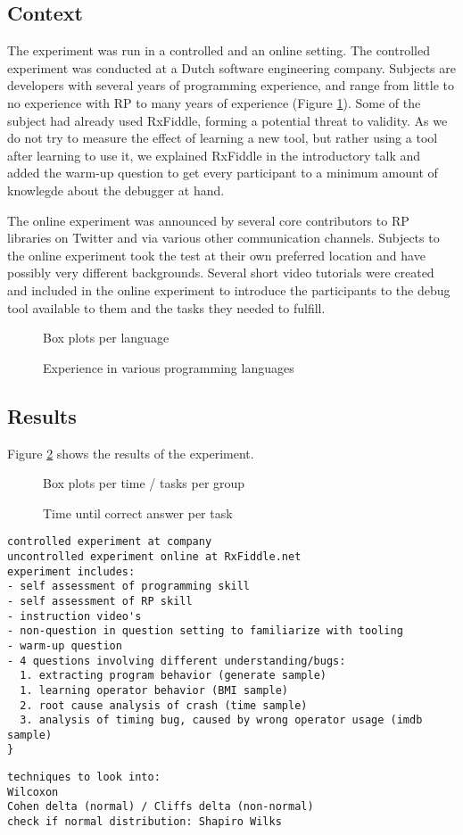 
\subsection{Context}
The experiment was run in a controlled and an online setting.
The controlled experiment was conducted at a Dutch software engineering company. Subjects are developers with several years of programming experience, and range from little to no experience with RP to many years of experience (Figure \ref{fig-experience}). Some of the subject had already used RxFiddle, forming a potential threat to validity. As we do not try to measure the effect of learning a new tool, but rather using a tool after learning to use it, we explained RxFiddle in the introductory talk and added the warm-up question to get every participant to a minimum amount of knowlegde about the debugger at hand.

The online experiment was announced by several core contributors to RP libraries on Twitter and via various other communication channels. Subjects to the online experiment took the test at their own preferred location and have possibly very different backgrounds. Several short video tutorials were created and included in the online experiment to introduce the participants to the debug tool available to them and the tasks they needed to fulfill.

\begin{figure}
Box plots per language
\caption{Experience in various programming languages}
\label{fig-experience}
\end{figure}

\subsection{Results}
Figure \ref{fig-timePerTask} shows the results of the experiment.

\begin{figure}
Box plots per time / tasks per group
\caption{Time until correct answer per task}
\label{fig-timePerTask}
\end{figure}



{
\color{red}
\begin{verbatim}
controlled experiment at company
uncontrolled experiment online at RxFiddle.net
experiment includes:
- self assessment of programming skill
- self assessment of RP skill
- instruction video's
- non-question in question setting to familiarize with tooling
- warm-up question
- 4 questions involving different understanding/bugs:
  1. extracting program behavior (generate sample)
  1. learning operator behavior (BMI sample)
  2. root cause analysis of crash (time sample)
  3. analysis of timing bug, caused by wrong operator usage (imdb sample)
}
\end{verbatim}
\begin{verbatim}
techniques to look into:
Wilcoxon
Cohen delta (normal) / Cliffs delta (non-normal)
check if normal distribution: Shapiro Wilks
\end{verbatim}
}